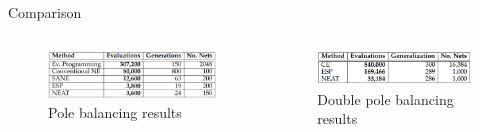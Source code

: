 \documentclass{beamer}
\begin{document}
\begin{frame}{Comparison}
    \begin{columns}
        \begin{column}{0.5\textwidth}
            \begin{figure}[c]
                \includegraphics[width=\textwidth]{img/pole_balancing_table.png}
                \caption{Pole balancing results}
            \end{figure}\end{column}
        \begin{column}{0.5\textwidth}
            \begin{figure}[c]
                \includegraphics[width=\textwidth]{img/double_pole_balancing_table.png}
                \caption{Double pole balancing results}
            \end{figure}
        \end{column}
    \end{columns}
\end{frame}
\end{document}

